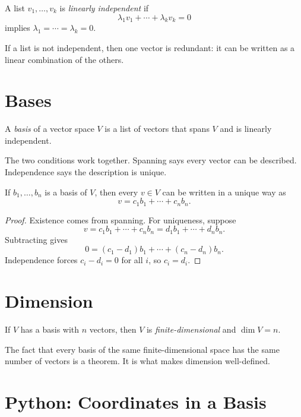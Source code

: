 \begin{definition}
  A list $v_1,\ldots,v_k$ is \emph{linearly independent} if
  \[
    \lambda_1v_1+\cdots+\lambda_kv_k=0
  \]
  implies $\lambda_1=\cdots=\lambda_k=0$.
\end{definition}

If a list is not independent, then one vector is redundant: it can be written
as a linear combination of the others.

\section{Bases}

\begin{definition}
  A \emph{basis} of a vector space $V$ is a list of vectors that spans $V$ and
  is linearly independent.
\end{definition}

The two conditions work together. Spanning says every vector can be described.
Independence says the description is unique.

\begin{theorem}
  If $b_1,\ldots,b_n$ is a basis of $V$, then every $v\in V$ can be written in
  a unique way as
  \[
    v=c_1b_1+\cdots+c_nb_n.
  \]
\end{theorem}

\begin{proof}
  Existence comes from spanning. For uniqueness, suppose
  \[
    v=c_1b_1+\cdots+c_nb_n=d_1b_1+\cdots+d_nb_n.
  \]
  Subtracting gives
  \[
    0=(c_1-d_1)b_1+\cdots+(c_n-d_n)b_n.
  \]
  Independence forces $c_i-d_i=0$ for all $i$, so $c_i=d_i$.
\end{proof}

\section{Dimension}

\begin{definition}
  If $V$ has a basis with $n$ vectors, then $V$ is \emph{finite-dimensional}
  and $\dim V=n$.
\end{definition}

The fact that every basis of the same finite-dimensional space has the same
number of vectors is a theorem. It is what makes dimension well-defined.

\section{Python: Coordinates in a Basis}

